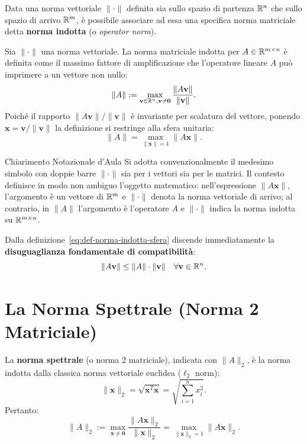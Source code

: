 Data una norma vettoriale $\|\cdot\|$ definita sia sullo spazio di partenza $\mathbb{R}^n$ che sullo spazio di arrivo $\mathbb{R}^m$, \`e possibile associare ad essa una specifica norma matriciale detta \textbf{norma indotta} (o \textit{operator norm}).

\begin{definition}
Sia $\|\cdot\|$ una norma vettoriale. La norma matriciale indotta per $A \in \mathbb{R}^{m \times n}$ \`e definita come il massimo fattore di amplificazione che l'operatore lineare $A$ pu\`o imprimere a un vettore non nullo:
\begin{equation}
    \|A\| := \max_{\mathbf{v} \in \mathbb{R}^n, \mathbf{v} \neq \mathbf{0}} \frac{\|A\mathbf{v}\|}{\|\mathbf{v}\|}.
\end{equation}
Poich\'e il rapporto $\|A\mathbf{v}\| / \|\mathbf{v}\|$ \`e invariante per scalatura del vettore, ponendo $\mathbf{x} = \mathbf{v} / \|\mathbf{v}\|$ la definizione si restringe alla sfera unitaria:
\begin{equation}
    \label{eq:def-norma-indotta-sfera}
    \|A\| = \max_{\|\mathbf{x}\| = 1} \|A\mathbf{x}\|.
\end{equation}
\end{definition}

\begin{noteblock}{Chiarimento Notazionale d'Aula}
Si adotta convenzionalmente il medesimo simbolo con doppie barre $\|\cdot\|$ sia per i vettori sia per le matrici. Il contesto definisce in modo non ambiguo l'oggetto matematico: nell'espressione $\|A\mathbf{x}\|$, l'argomento \`e un vettore di $\mathbb{R}^m$ e $\|\cdot\|$ denota la norma vettoriale di arrivo; al contrario, in $\|A\|$ l'argomento \`e l'operatore $A$ e $\|\cdot\|$ indica la norma indotta su $\mathbb{R}^{m \times n}$.
\end{noteblock}

Dalla definizione~\eqref{eq:def-norma-indotta-sfera} discende immediatamente la \textbf{disuguaglianza fondamentale di compatibilit\`a}:
\begin{equation}
    \|A\mathbf{v}\| \le \|A\| \cdot \|\mathbf{v}\| \quad \forall \mathbf{v} \in \mathbb{R}^n.
\end{equation}

\FloatBarrier
\section{La Norma Spettrale (Norma 2 Matriciale)}
\label{sec:norma-spettrale}

La \textbf{norma spettrale} (o norma 2 matriciale), indicata con $\|A\|_2$, \`e la norma indotta dalla classica norma vettoriale euclidea ($\ell_2$ norm):
\begin{equation}
    \|\mathbf{x}\|_2 = \sqrt{\mathbf{x}^T \mathbf{x}} = \sqrt{\sum_{i=1}^n x_i^2}.
\end{equation}
Pertanto:
\begin{equation}
    \|A\|_2 := \max_{\mathbf{x} \neq \mathbf{0}} \frac{\|A\mathbf{x}\|_2}{\|\mathbf{x}\|_2} = \max_{\|\mathbf{x}\|_2 = 1} \|A\mathbf{x}\|_2.
\end{equation}

